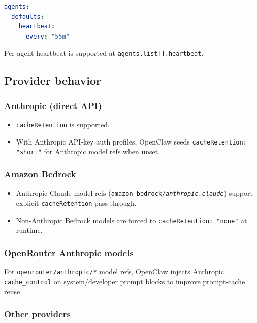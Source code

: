 \begin{lstlisting}[language=yaml]
agents:
  defaults:
    heartbeat:
      every: "55m"
\end{lstlisting}


Per-agent heartbeat is supported at \texttt{agents.list[].heartbeat}.

\subsection{Provider behavior}


\subsubsection{Anthropic (direct API)}


\begin{itemize}
  \item \texttt{cacheRetention} is supported.
  \item With Anthropic API-key auth profiles, OpenClaw seeds \texttt{cacheRetention: "short"} for Anthropic model refs when unset.
\end{itemize}


\subsubsection{Amazon Bedrock}


\begin{itemize}
  \item Anthropic Claude model refs (\texttt{amazon-bedrock/\textit{anthropic.claude}}) support explicit \texttt{cacheRetention} pass-through.
  \item Non-Anthropic Bedrock models are forced to \texttt{cacheRetention: "none"} at runtime.
\end{itemize}


\subsubsection{OpenRouter Anthropic models}


For \texttt{openrouter/anthropic/*} model refs, OpenClaw injects Anthropic \texttt{cache\_control} on system/developer prompt blocks to improve prompt-cache reuse.

\subsubsection{Other providers}


